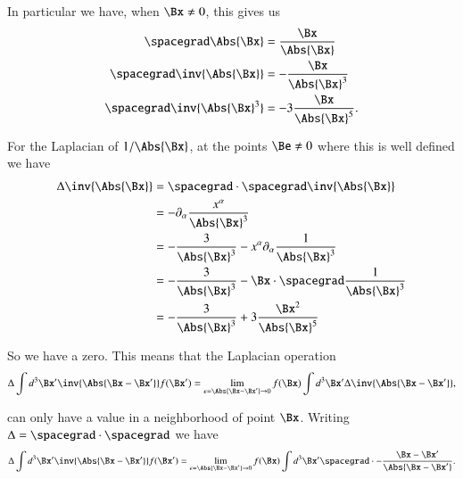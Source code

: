 In particular we have, when \(\Bx \ne 0\), this gives us
%
\begin{equation}\label{eqn:relativisticElectrodynamicsL18:135}
\begin{aligned}
\spacegrad \Abs{\Bx} &= \frac{\Bx}{\Abs{\Bx}} \\
\spacegrad \inv{\Abs{\Bx}} &= -\frac{\Bx}{\Abs{\Bx}^3} \\
\spacegrad \inv{\Abs{\Bx}^3} &= -3 \frac{\Bx}{\Abs{\Bx}^5}.
\end{aligned}
\end{equation}

For the Laplacian of \(1/\Abs{\Bx}\), at the points \(\Be \ne 0\) where this is well defined we have
%
\begin{equation}\label{eqn:relativisticElectrodynamicsL18:800}
\begin{aligned}
\Delta \inv{\Abs{\Bx}}
&=
\spacegrad \cdot \spacegrad \inv{\Abs{\Bx}} \\
&=
-\partial_\alpha \frac{x^\alpha}{\Abs{\Bx}^3} \\
&=
-\frac{3}{\Abs{\Bx}^3}
- x^\alpha \partial_\alpha \frac{1}{\Abs{\Bx}^3} \\
&=
-\frac{3}{\Abs{\Bx}^3}
- \Bx \cdot \spacegrad \frac{1}{\Abs{\Bx}^3} \\
&=
-\frac{3}{\Abs{\Bx}^3}
+ 3 \frac{\Bx^2}{\Abs{\Bx}^5}
\end{aligned}
\end{equation}

So we have a zero.  This means that the Laplacian operation
%
\begin{equation}\label{eqn:relativisticElectrodynamicsL18:300}
\Delta \int d^3 \Bx' \inv{\Abs{\Bx - \Bx'} } f(\Bx')
=
\lim_{\epsilon = \Abs{\Bx -\Bx'} \rightarrow 0}
f(\Bx) \int d^3 \Bx' \Delta \inv{\Abs{\Bx - \Bx'}},
\end{equation}

can only have a value in a neighborhood of point \(\Bx\).  Writing \(\Delta = \spacegrad \cdot \spacegrad\) we have
%
\begin{equation}\label{eqn:relativisticElectrodynamicsL18:320}
\Delta \int d^3 \Bx' \inv{\Abs{\Bx - \Bx'} } f(\Bx')
=
\lim_{\epsilon = \Abs{\Bx -\Bx'} \rightarrow 0}
f(\Bx) \int d^3 \Bx' \spacegrad \cdot -\frac{\Bx - \Bx'}{\Abs{\Bx - \Bx'}}.
\end{equation}

